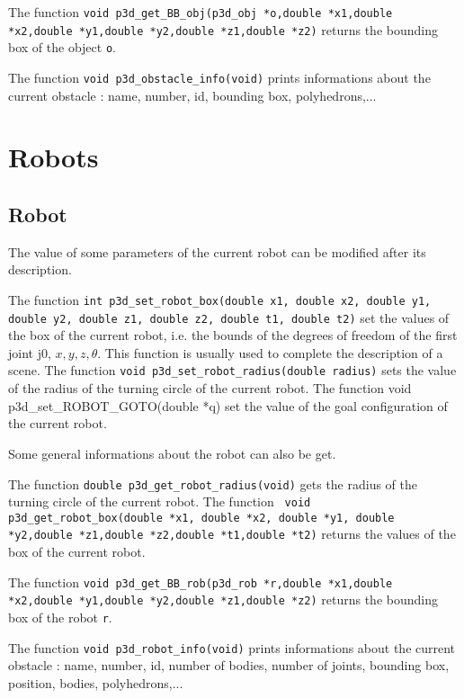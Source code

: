 The function {\tt void p3d\_get\_BB\_obj(p3d\_obj *o,double *x1,double
*x2,double *y1,double *y2,double *z1,double *z2)}
 returns the bounding box of the object {\tt o}.

The function {\tt void p3d\_obstacle\_info(void)}
 prints informations
about the current obstacle : name, number, id, bounding box,
polyhedrons,...

\section{Robots}

\subsection{Robot}

The value of some parameters of the current robot can be modified
after its description. 

The function {\tt int p3d\_set\_robot\_box(double x1, double x2,
double y1, double y2, double z1, double z2, double t1, double t2)}
 set
the values of the box of the current robot, i.e. the bounds of the
degrees of freedom of the first joint j0, $x,y,z,\theta$. This
function is usually used to complete the description of a scene. 
The function {\tt void p3d\_set\_robot\_radius(double radius)}
 sets
the value of the radius of the turning circle of the current robot. 
The function {void p3d\_set\_ROBOT\_GOTO(double *q)}
 set the value of
the goal configuration of the current robot.

Some general informations about the robot can also be get.

The function {\tt double p3d\_get\_robot\_radius(void)}
 gets the
radius of the turning circle of the current robot. The function {\tt
void p3d\_get\_robot\_box(double *x1, double *x2, double *y1, double
*y2,double *z1,double *z2,double *t1,double *t2)}
 returns the values of
the box of the current robot.

The function {\tt void p3d\_get\_BB\_rob(p3d\_rob *r,double *x1,double
*x2,double *y1,double *y2,double *z1,double *z2)}
 returns the bounding
box of the robot {\tt r}.

The function {\tt void p3d\_robot\_info(void)}
 prints informations
about the current obstacle : name, number, id, number of bodies,
number of joints, bounding box, position, bodies, polyhedrons,...

